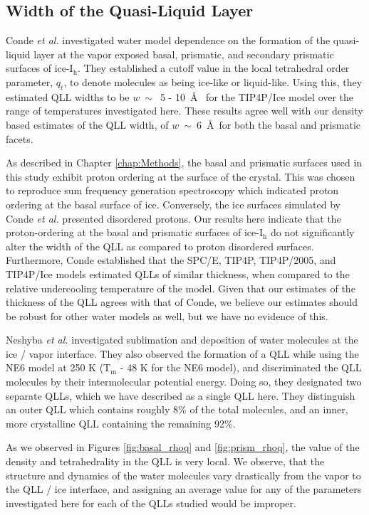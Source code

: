 \subsection{Width of the Quasi-Liquid Layer}
Conde \textit{et al.} investigated water model dependence on the
formation of the quasi-liquid layer at the vapor exposed basal,
prismatic, and secondary prismatic surfaces of
ice-I$_\mathrm{h}$.\cite{Conde2008} They established a cutoff value in
the local tetrahedral order parameter, $q_t$, to denote molecules as
being ice-like or liquid-like. Using this, they estimated QLL widths
to be $w~\sim$~5 - 10~\AA~ for the TIP4P/Ice model over the range of
temperatures investigated here. These results agree well with our
density based estimates of the QLL width, of $w~\sim~6$~\AA~for both
the basal and prismatic facets.

As described in Chapter \ref{chap:Methods}, the basal and prismatic
surfaces used in this study exhibit proton ordering at the surface of
the crystal. This was chosen to reproduce sum frequency generation
spectroscopy which indicated proton ordering at the basal surface of
ice. Conversely, the ice surfaces simulated by Conde \textit{et al.}
presented disordered protons. Our results here indicate that the
proton-ordering at the basal and prismatic surfaces of
ice-I$_\mathrm{h}$ do not significantly alter the width of the QLL as
compared to proton disordered surfaces.  Furthermore, Conde
established that the SPC/E, TIP4P, TIP4P/2005, and TIP4P/Ice models
estimated QLLs of similar thickness, when compared to the relative
undercooling temperature of the model.\cite{Conde2008} Given that our
estimates of the thickness of the QLL agrees with that of Conde, we
believe our estimates should be robust for other water models as well,
but we have no evidence of this.

Neshyba \textit{et al.} investigated sublimation and deposition of
water molecules at the ice / vapor interface.\cite{Neshyba2009} They
also observed the formation of a QLL while using the NE6
model\cite{Nada2003a} at 250 K (T$_\mathrm{m}$ - 48 K for the NE6
model), and discriminated the QLL molecules by their intermolecular
potential energy. Doing so, they designated two separate QLLs, which
we have described as a single QLL here. They distinguish an outer QLL
which contains roughly 8\% of the total molecules, and an inner, more
crystalline QLL containing the remaining 92\%. 

As we observed in Figures \ref{fig:basal_rhoq} and
\ref{fig:prism_rhoq}, the value of the density and tetrahedrality in
the QLL is very local. We observe, that the structure and dynamics of
the water molecules vary drastically from the vapor to the QLL / ice
interface, and assigning an average value for any of the parameters
investigated here for each of the QLLs studied would be improper.


